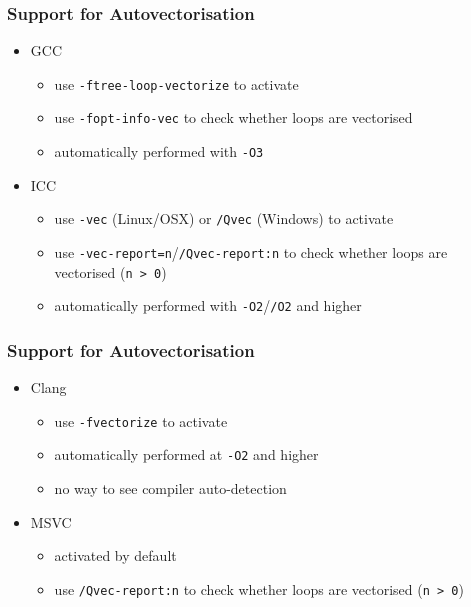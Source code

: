 \subsubsection{Support for
Autovectorisation}\label{support-for-autovectorisation}

\begin{itemize}
\itemsep1pt\parskip0pt
\item
  GCC

  \begin{itemize}
  \itemsep1pt\parskip0pt
  \item
    use \texttt{-ftree-loop-vectorize} to activate
  \item
    use \texttt{-fopt-info-vec} to check whether loops are vectorised
  \item
    automatically performed with \texttt{-O3}
  \end{itemize}
\item
  ICC

  \begin{itemize}
  \itemsep1pt\parskip0pt
  \item
    use \texttt{-vec} (Linux/OSX) or \texttt{/Qvec} (Windows) to
    activate
  \item
    use \texttt{-vec-report=n}/\texttt{/Qvec-report:n} to check whether
    loops are vectorised (\texttt{n \textgreater{} 0})
  \item
    automatically performed with \texttt{-O2}/\texttt{/O2} and higher
  \end{itemize}
\end{itemize}

\subsubsection{Support for
Autovectorisation}\label{support-for-autovectorisation-1}

\begin{itemize}
\itemsep1pt\parskip0pt
\item
  Clang

  \begin{itemize}
  \itemsep1pt\parskip0pt
  \item
    use \texttt{-fvectorize} to activate
  \item
    automatically performed at \texttt{-O2} and higher
  \item
    no way to see compiler auto-detection
  \end{itemize}
\item
  MSVC

  \begin{itemize}
  \itemsep1pt\parskip0pt
  \item
    activated by default
  \item
    use \texttt{/Qvec-report:n} to check whether loops are vectorised
    (\texttt{n \textgreater{} 0})
  \end{itemize}
\end{itemize}

